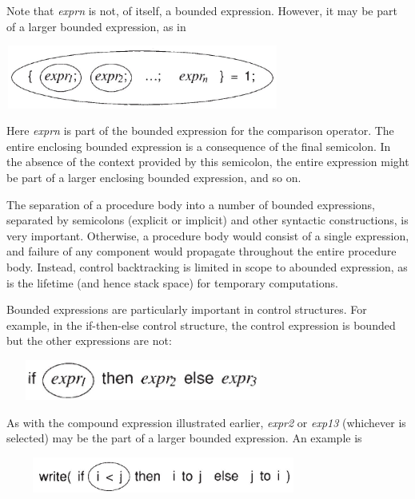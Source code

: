 Note that \textit{exprn }is not, of itself, a bounded expression.
However, it may be part of a larger bounded expression, as in

\begin{center}
\includegraphics[width=3.5425in,height=0.8173in]{ib-img/ib-img058.jpg}
\end{center}

Here \textit{exprn} is part of the bounded expression for the
comparison operator. The entire enclosing bounded expression is a
consequence of the final semicolon. In the absence of the context
provided by this semicolon, the entire expression might be part of a
larger enclosing bounded expression, and so on.

The separation of a procedure body into a number of bounded
expressions, separated by semicolons (explicit or implicit) and other
syntactic constructions, is very important. Otherwise, a procedure
body would consist of a single expression, and failure of any
component would propagate throughout the entire procedure
body. Instead, control backtracking is limited in scope to abounded
expression, as is the lifetime (and hence stack space) for temporary
computations.

Bounded expressions are particularly important in control
structures. For example, in the if-then-else control structure, the
control expression is bounded but the other expressions are not:

\begin{center}
\includegraphics[width=3.5508in,height=0.5244in]{ib-img/ib-img059.jpg}
\end{center}

As with the compound expression illustrated earlier, \textit{expr2} or
\textit{exp13} (whichever is selected) may be the part of a larger
bounded expression. An example is

\begin{center}
\includegraphics[width=4.0839in,height=0.4571in]{ib-img/ib-img060.jpg}
\end{center}

